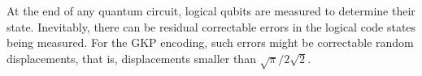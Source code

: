 \documentclass[aps,prx,showpacs,notitlepage,twocolumn,superscriptaddress,nofootinbib,preprintnumbers,floatfix,10pt, longbibliography]{revtex4-2}
\begin{document}
\begin{figure}
  \label{fig:bb1-readout}
\end{figure}

At the end of any quantum circuit, logical qubits are measured to determine their state. Inevitably, there can be residual correctable errors in the logical code states being measured. For the GKP encoding, such errors might be correctable random displacements, that is, displacements smaller than $\sqrt{\pi}/2\sqrt{2}$.
\end{document}
